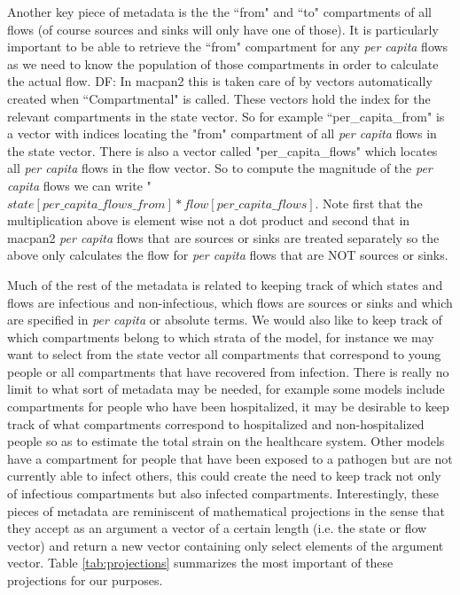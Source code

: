 \documentclass[referee,sn-basic]{sn-jnl}%
\theoremstyle{definition}
\newcommand{\df}[1]{{\color{orange} DF: #1}}
\begin{document}
Another key piece of metadata is the the ``from" and ``to" compartments of all flows (of course sources and sinks will only have one of those). It is particularly important to be able to retrieve the ``from" compartment for any \emph{per capita} flows as we need to know the population of those compartments in order to calculate the actual flow. \df{In macpan2 this is taken care of by vectors automatically created when ``Compartmental" is called. These vectors hold the index for the relevant compartments in the state vector. So for example ``per\_capita\_from" is a vector with indices locating the  "from" compartment of all \emph{per capita} flows in the state vector. There is also a vector called "per\_capita\_flows" which locates all \emph{per capita} flows in the flow vector. So to compute the magnitude of the \emph{per capita} flows we can write "$state[per\_capita\_flows\_from] * flow[per\_capita\_flows]$. Note first that the multiplication above is element wise not a dot product and second that in macpan2 \emph{per capita} flows that are sources or sinks are treated separately so the above only calculates the flow for \emph{per capita} flows that are NOT sources or sinks.}


Much of the rest of the metadata is related to keeping track of which states and flows are infectious and non-infectious, which flows are sources or sinks and which are specified in \emph{per capita} or absolute terms. We would also like to keep track of which compartments belong to which strata of the model, for instance we may want to select from the state vector all compartments that correspond to young people or all compartments that have recovered from infection. There is really no limit to what sort of metadata may be needed, for example some models include compartments for people who have been hospitalized, it may be desirable to keep track of what compartments correspond to hospitalized and non-hospitalized people so as to estimate the total strain on the healthcare system. Other models have a compartment for people that have been exposed to a pathogen but are not currently able to infect others, this could create the need to keep track not only of infectious compartments but also infected compartments. Interestingly, these pieces of metadata are reminiscent of mathematical projections in the sense that they accept as an argument a vector of a certain length (i.e. the state or flow vector) and return a new vector containing only select elements of the argument vector. Table \ref{tab:projections} summarizes the most important of these projections for our purposes.
\end{document}
